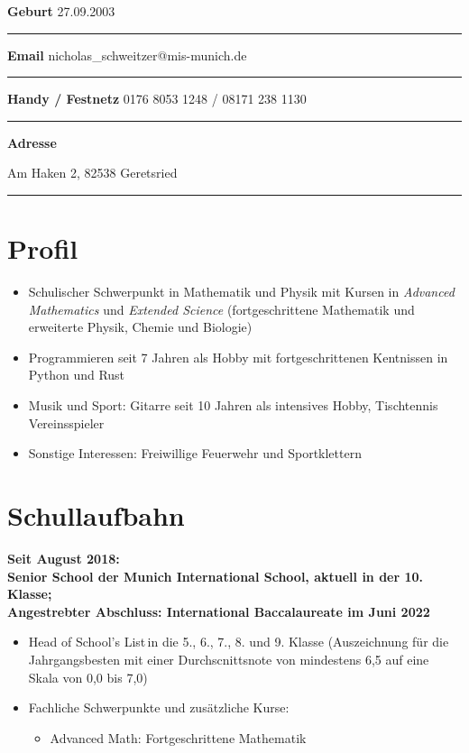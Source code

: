 \documentclass[12pt]{article}
\newcommand{\sect}[1]{\vspace{-12pt}\section*{#1}\vspace{-12pt}}
\newcommand{\sep}{{\color{gray}\vspace{-12pt}\hrule}}
\begin{document}
\textbf{Geburt} \hfill{27.09.2003} \, \\
\sep
\textbf{Email} \hfill{nicholas\_schweitzer@mis-munich.de} \, \\
\sep
\textbf{Handy / Festnetz} \hfill{0176 8053 1248 / 08171 238 1130} \, \\
\sep
\textbf{Adresse} \hfill{Am Haken 2, 82538 Geretsried \, \\
  \sep

  \sect{Profil}
  \begin{itemize}
    \itemsep3pt

  \item Schulischer Schwerpunkt in Mathematik und Physik mit Kursen in \textit{\glqq
    Advanced Mathematics\grqq} und \textit{\glqq Extended Science\grqq}
    (fortgeschrittene Mathematik und erweiterte Physik, Chemie und Biologie)

  \item Programmieren seit 7 Jahren als Hobby mit fortgeschrittenen Kentnissen in
    Python und Rust

  \item Musik und Sport: Gitarre seit 10 Jahren als intensives Hobby,
    Tischtennis Vereinsspieler

  \item Sonstige Interessen: Freiwillige Feuerwehr und Sportklettern

  \end{itemize}
  \vspace{-12pt}

  \sect{Schullaufbahn}

  \textbf{Seit August 2018: \\
    Senior School der Munich International School, aktuell in der 10. Klasse; \\
    Angestrebter Abschluss: International Baccalaureate im Juni 2022
  }

  \vspace{-10pt}
  \begin{itemize}
    \itemsep3pt
  \item \glqq Head of School's List\grqq \,in die 5., 6., 7., 8. und 9. Klasse
    (Auszeichnung f{\"u}r die Jahrgangsbesten mit einer Durchscnittsnote von
    mindestens 6,5 auf eine Skala von 0,0 bis 7,0)

  \item Fachliche Schwerpunkte und zus{\"a}tzliche Kurse:

    \begin{itemize}
      \itemsep0pt
      \vspace{-12pt}
    \item \glqq Advanced Math\grqq: Fortgeschrittene Mathematik


\end{itemize}
\end{itemize}}
\end{document}
